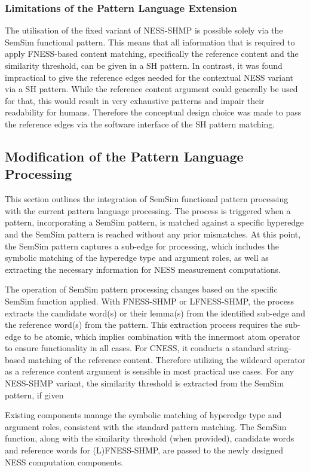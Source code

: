 \documentclass[11pt]{scrreprt}
\begin{document}
\subsubsection{Limitations of the Pattern Language Extension}
\label{sec:pl-extension-limitations}
The utilisation of the fixed variant of NESS-SHMP is possible solely via the SemSim functional pattern. This means that all information that is required to apply FNESS-based content matching, specifically the reference content and the similarity threshold, can be given in a SH pattern. In contrast, it was found impractical to give the reference edges needed for the contextual NESS variant via a SH pattern. While the reference content argument could generally be used for that, this would result in very exhaustive patterns and impair their readability for humans. Therefore the conceptual design choice was made to pass the reference edges via the software interface of the SH pattern matching.


\subsection{Modification of the Pattern Language Processing}
This section outlines the integration of SemSim functional pattern processing with the current pattern language processing. The process is triggered when a pattern, incorporating a SemSim pattern, is matched against a specific hyperedge and the SemSim pattern is reached without any prior mismatches. At this point, the SemSim pattern captures a sub-edge for processing, which includes the symbolic matching of the hyperedge type and argument roles, as well as extracting the necessary information for NESS measurement computations.

The operation of SemSim pattern processing changes based on the specific SemSim function applied. With FNESS-SHMP or LFNESS-SHMP, the process extracts the candidate word(s) or their lemma(s) from the identified sub-edge and the reference word(s) from the pattern. This extraction process requires the sub-edge to be atomic, which implies combination with the innermost atom operator to ensure functionality in all cases. For CNESS, it conducts a standard string-based matching of the reference content. Therefore  utilizing the wildcard operator as a reference content argument is sensible in most practical use cases. For any NESS-SHMP variant, the similarity threshold is extracted from the SemSim pattern, if given

Existing components manage the symbolic matching of hyperedge type and argument roles, consistent with the standard pattern matching. The SemSim function, along with the similarity threshold (when provided), candidate words and reference words for (L)FNESS-SHMP, are passed to the newly designed NESS computation components.
\end{document}
